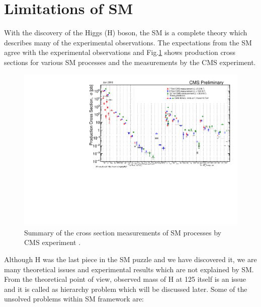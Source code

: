 \section{Limitations of SM}
\label{SMLimitations}
With the discovery of the Higgs (H) boson, the SM is a complete theory which describes many of the experimental observations. The expectations from the SM agree with the experimental observations and Fig.\ref{fig:SigmaNew_v0} shows production cross sections for various SM processes and the measurements by the CMS experiment.
\begin{figure}[h]
\centering
\includegraphics[width=0.9\linewidth]{../Figures/Chap1/SigmaNew_v0}
\caption[SM cross section measurements by CMS]{Summary of the cross section measurements of SM processes by CMS experiment \cite{SMxsec}.}
\label{fig:SigmaNew_v0}
\end{figure}
Although H was the last piece in the SM puzzle and we have discovered it, we are many theoretical issues and experimental results which are not explained by SM. From the theoretical point of view, observed mass of H at 125 \gev itself is an issue and it is called as hierarchy problem which will be discussed later. Some of the unsolved problems within SM framework are:
